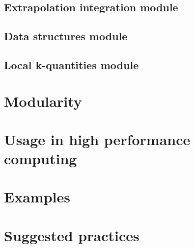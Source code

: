 \documentclass[10pt,a4paper]{article}
\begin{document}
\subsection{Extrapolation integration module}
\subsection{Data structures module}\label{sec:data_structures}
\subsection{Local k-quantities module}\label{sec:local_k_quantities}
\section{Modularity}\label{sec:modularity}
\section{Usage in high performance computing}
\section{Examples}
\section{Suggested practices}
\nocite{*}


\end{document}
